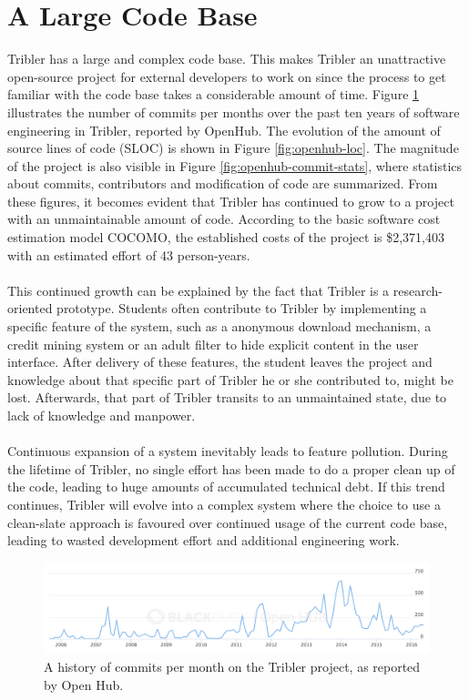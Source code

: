 \section{A Large Code Base}
Tribler has a large and complex code base. This makes Tribler an unattractive open-source project for external developers to work on since the process to get familiar with the code base takes a considerable amount of time. Figure \ref{fig:openhub-commits} illustrates the number of commits per months over the past ten years of software engineering in Tribler, reported by OpenHub\cite{openhubtribler}. The evolution of the amount of source lines of code (SLOC) is shown in Figure \ref{fig:openhub-loc}. The magnitude of the project is also visible in Figure \ref{fig:openhub-commit-stats}, where statistics about commits, contributors and modification of code are summarized. From these figures, it becomes evident that Tribler has continued to grow to a project with an unmaintainable amount of code. According to the basic software cost estimation model COCOMO\cite{kemerer1987empirical}, the established costs of the project is \$2,371,403 with an estimated effort of 43 person-years.\\\\
This continued growth can be explained by the fact that Tribler is a research-oriented prototype. Students often contribute to Tribler by implementing a specific feature of the system, such as a anonymous download mechanism, a credit mining system or an adult filter to hide explicit content in the user interface. After delivery of these features, the student leaves the project and knowledge about that specific part of Tribler he or she contributed to, might be lost. Afterwards, that part of Tribler transits to an unmaintained state, due to lack of knowledge and manpower.\\\\
Continuous expansion of a system inevitably leads to feature pollution. During the lifetime of Tribler, no single effort has been made to do a proper clean up of the code, leading to huge amounts of accumulated technical debt. If this trend continues, Tribler will evolve into a complex system where the choice to use a clean-slate approach is favoured over continued usage of the current code base, leading to wasted development effort and additional engineering work.

\begin{figure}[!h]
	\centering
	\includegraphics[width=\columnwidth]{images/problem_description/openhub_commits}
	\caption{A history of commits per month on the Tribler project, as reported by Open Hub.}
	\label{fig:openhub-commits}
\end{figure}

